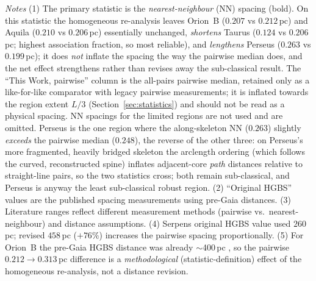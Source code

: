 \documentclass[usenatbib,twoside,twocolumn]{mnras}
\begin{document}
\begin{table}
\vspace{0.1in}
\footnotesize
\emph{Notes} (1) The primary statistic is the \emph{nearest-neighbour} (NN) spacing (bold). On this statistic the homogeneous re-analysis leaves Orion~B ($0.207$ vs $0.212$\,pc) and Aquila ($0.210$ vs $0.206$\,pc) essentially unchanged, \emph{shortens} Taurus ($0.124$ vs $0.206$\,pc; highest association fraction, so most reliable), and \emph{lengthens} Perseus ($0.263$ vs $0.199$\,pc); it does \emph{not} inflate the spacing the way the pairwise median does, and the net effect strengthens rather than revises away the sub-classical result. The ``This Work, pairwise'' column is the all-pairs pairwise median, retained only as a like-for-like comparator with legacy pairwise measurements; it is inflated towards the region extent $L/3$ (Section~\ref{sec:statistics}) and should not be read as a physical spacing. NN spacings for the limited regions are not used and are omitted. Perseus is the one region where the along-skeleton NN ($0.263$) slightly \emph{exceeds} the pairwise median ($0.248$), the reverse of the other three: on Perseus's more fragmented, heavily bridged skeleton the arclength ordering (which follows the curved, reconstructed spine) inflates adjacent-core \emph{path} distances relative to straight-line pairs, so the two statistics cross; both remain sub-classical, and Perseus is anyway the least sub-classical robust region. (2) ``Original HGBS'' values are the published spacing measurements using pre-Gaia distances. (3) Literature ranges reflect different measurement methods (pairwise vs.\ nearest-neighbour) and distance assumptions. (4) Serpens original HGBS value used $260$\,pc; revised $458$\,pc ($+76\%$) increases the pairwise spacing proportionally. (5) For Orion~B the pre-Gaia HGBS distance was already $\sim$400\,pc \citep{Konyves2020}, so the pairwise $0.212\to0.313$\,pc difference is a \emph{methodological} (statistic-definition) effect of the homogeneous re-analysis, not a distance revision.
\end{table}
\end{document}
